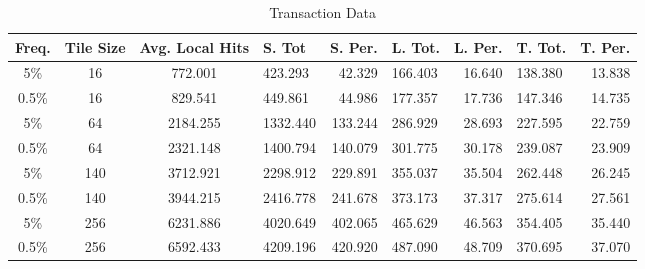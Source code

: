 \begin{table}
	\begin{center}
		\begin{tabular}{|c|c|c|l|r|l|r|l|r|}
			\hline
			Freq. & Tile Size & Avg. Local Hits & S. Tot & S. Per. & L. Tot.  & L. Per. & T. Tot. & T. Per. \\
			\hline
			5\% & 16 & 772.001 & 423.293 & 42.329 & 166.403 & 16.640 & 138.380 & 13.838 \\
			\hline
			0.5\% & 16 & 829.541 & 449.861 & 44.986 & 177.357 & 17.736 & 147.346 & 14.735 \\
			\hline
			5\% & 64 & 2184.255 & 1332.440 & 133.244 & 286.929 & 28.693 & 227.595 & 22.759 \\
			\hline
			0.5\% & 64 & 2321.148 & 1400.794 & 140.079 & 301.775 & 30.178 & 239.087 & 23.909 \\
			\hline
			5\% & 140 & 3712.921 & 2298.912 & 229.891 & 355.037 & 35.504 & 262.448 & 26.245 \\
			\hline
			0.5\% & 140 & 3944.215 & 2416.778 & 241.678 & 373.173 & 37.317 & 275.614 & 27.561 \\
			\hline
			5\% & 256 & 6231.886 & 4020.649 & 402.065 & 465.629 & 46.563 & 354.405 & 35.440 \\
			\hline
			0.5\% & 256 & 6592.433 & 4209.196 & 420.920 & 487.090 & 48.709 & 370.695 & 37.070 \\
			\hline
		\end{tabular}
	\end{center}
	\caption{Transaction Data}
	\label{tab:transact}
\end{table}